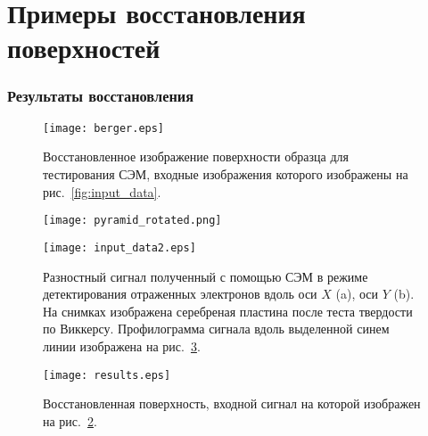 \documentclass{beamer}
\begin{document}
\section{Примеры восстановления поверхностей}
\begin{frame}
    \sectionpage
\end{frame}

\begin{frame}[c,allowframebreaks]
    \frametitle{Результаты восстановления}

    \begin{figure}[ht]
        \texttt{[image: berger.eps]}
        \caption{Восстановленное изображение поверхности образца для тестирования СЭМ, входные
        изображения которого изображены на рис.~\ref{fig:input_data}.}
        {\label{fig:berger}}%
    \end{figure}

\framebreak

    \begin{figure}[ht]
        \texttt{[image: pyramid\_rotated.png]}
    \end{figure}

\framebreak

    \begin{figure}[ht]
        \texttt{[image: input\_data2.eps]}
        \caption{Разностный сигнал полученный с помощью СЭМ в режиме детектирования отраженных
            электронов вдоль оси $X$ (a), оси $Y$ (b). На снимках изображена серебреная пластина
            после теста твердости по Виккерсу. Профилограмма сигнала вдоль выделенной синем линии
            изображена на рис.~\ref{fig:results}.}
        {\label{fig:input_data2}}%
    \end{figure}

\framebreak

    \begin{figure}[t]
        \texttt{[image: results.eps]}
        \caption{Восстановленная поверхность, входной сигнал на которой изображен на
            рис.~\ref{fig:input_data2}.}
        {\label{fig:results}}
    \end{figure}


\end{frame}
\end{document}
